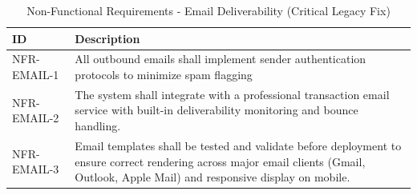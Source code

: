 {
    \begin{table}[H]
        \centering
        \caption{Non-Functional Requirements - Email Deliverability (Critical Legacy Fix)}
        \label{tab:nfreq-email-deliver} 
        \begin{tabular}{|l|p{11cm}|} %
            \hline
            \textbf{ID} & \textbf{Description} \\ \hline
            NFR-EMAIL-1 & All outbound emails shall implement sender authentication protocols to minimize spam flagging \\ \hline
            NFR-EMAIL-2 & The system shall integrate with a professional transaction email service with built-in deliverability monitoring and bounce handling. \\ \hline
            NFR-EMAIL-3 & Email templates shall be tested and validate before deployment to ensure correct rendering across major email clients (Gmail, Outlook, Apple Mail) and responsive display on mobile. \\ \hline
        \end{tabular}
    \end{table}    
}